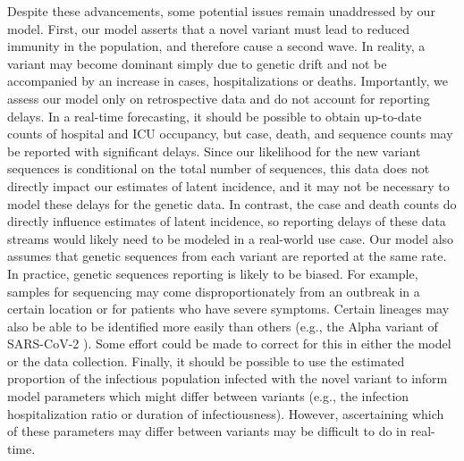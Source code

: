 Despite these advancements, some potential issues remain unaddressed by our model.
First, our model asserts that a novel variant must lead to reduced immunity in the population, and therefore cause a second wave.
In reality, a variant may become dominant simply due to genetic drift and not be accompanied by an increase in cases, hospitalizations or deaths.
Importantly, we assess our model only on retrospective data and do not account for reporting delays.
In a real-time forecasting, it should be possible to obtain up-to-date counts of hospital and ICU occupancy, but case, death, and sequence counts may be reported with significant delays.
Since our likelihood for the new variant sequences is conditional on the total number of sequences, this data does not directly impact our estimates of latent incidence, and it may not be necessary to model these delays for the genetic data.
In contrast, the case and death counts do directly influence estimates of latent incidence, so reporting delays of these data streams would likely need to be modeled in a real-world use case.
Our model also assumes that genetic sequences from each variant are reported at the same rate.
In practice, genetic sequences reporting is likely to be biased.
For example, samples for sequencing may come disproportionately from an outbreak in a certain location or for patients who have severe symptoms.
Certain lineages may also be able to be identified more easily than others (e.g., the Alpha variant of SARS-CoV-2 \citep{McMillen2022-ls}).
Some effort could be made to correct for this in either the model or the data collection.
Finally, it should be possible to use the estimated proportion of the infectious population infected with the novel variant to inform model parameters which might differ between variants (e.g., the infection hospitalization ratio or duration of infectiousness).
However, ascertaining which of these parameters may differ between variants may be difficult to do in real-time.




